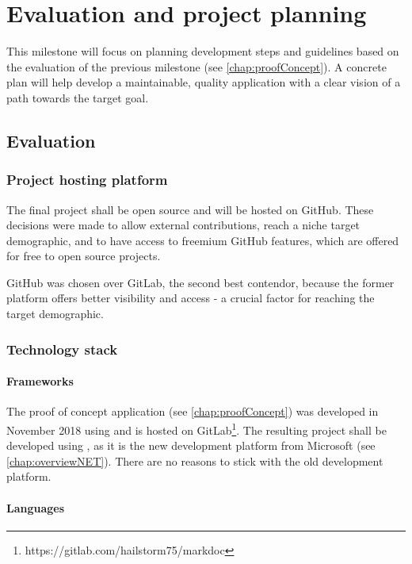 \chapter{Evaluation and project planning} \label{chap:evalProjPlan}

This milestone will focus on planning development steps and guidelines based on the evaluation of the previous milestone (see \ref{chap:proofConcept}).
A concrete plan will help develop a maintainable, quality application with a clear vision of a path towards the target goal.

\section{Evaluation}

\subsection{Project hosting platform}

The final project shall be open source and will be hosted on GitHub.
These decisions were made to allow external contributions, reach a niche target demographic, and to have access to freemium GitHub features, which are offered for free to open source projects.

GitHub was chosen over GitLab, the second best contendor, because the former platform offers better visibility and access - a crucial factor for reaching the target demographic.

\subsection{Technology stack}

\subsubsection{Frameworks}

The proof of concept application (see \ref{chap:proofConcept}) was developed in November 2018 using  and is hosted on GitLab\footnote{https://gitlab.com/hailstorm75/markdoc}. The resulting project shall be developed using , as it is the new development platform from Microsoft (see \ref{chap:overviewNET}). There are no reasons to stick with the old development platform.

\subsubsection{Languages}

